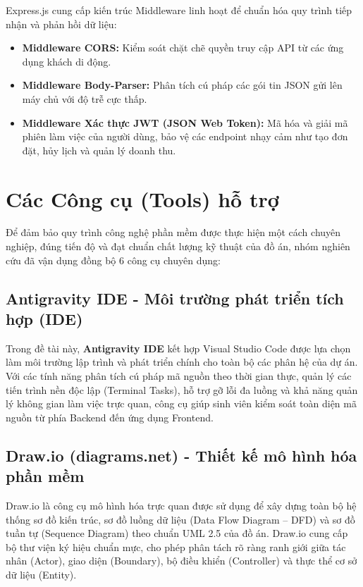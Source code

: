 Express.js cung cấp kiến trúc Middleware linh hoạt để chuẩn hóa quy trình tiếp nhận và phản hồi dữ liệu:
\begin{itemize}
    \item \textbf{Middleware CORS:} Kiểm soát chặt chẽ quyền truy cập API từ các ứng dụng khách di động.
    \item \textbf{Middleware Body-Parser:} Phân tích cú pháp các gói tin JSON gửi lên máy chủ với độ trễ cực thấp.
    \item \textbf{Middleware Xác thực JWT (JSON Web Token):} Mã hóa và giải mã phiên làm việc của người dùng, bảo vệ các endpoint nhạy cảm như tạo đơn đặt, hủy lịch và quản lý doanh thu.
\end{itemize}

\section{Các Công cụ (Tools) hỗ trợ}
\label{sec:cong-cu-ho-tro}

Để đảm bảo quy trình công nghệ phần mềm được thực hiện một cách chuyên nghiệp, đúng tiến độ và đạt chuẩn chất lượng kỹ thuật của đồ án, nhóm nghiên cứu đã vận dụng đồng bộ 6 công cụ chuyên dụng:

\subsection{Antigravity IDE - Môi trường phát triển tích hợp (IDE)}
Trong đề tài này, \textbf{Antigravity IDE} kết hợp Visual Studio Code được lựa chọn làm môi trường lập trình và phát triển chính cho toàn bộ các phân hệ của dự án. Với các tính năng phân tích cú pháp mã nguồn theo thời gian thực, quản lý các tiến trình nền độc lập (Terminal Tasks), hỗ trợ gỡ lỗi đa luồng và khả năng quản lý không gian làm việc trực quan, công cụ giúp sinh viên kiểm soát toàn diện mã nguồn từ phía Backend đến ứng dụng Frontend.

\subsection{Draw.io (diagrams.net) - Thiết kế mô hình hóa phần mềm}
Draw.io là công cụ mô hình hóa trực quan được sử dụng để xây dựng toàn bộ hệ thống sơ đồ kiến trúc, sơ đồ luồng dữ liệu (Data Flow Diagram -- DFD) và sơ đồ tuần tự (Sequence Diagram) theo chuẩn UML 2.5 của đồ án. Draw.io cung cấp bộ thư viện ký hiệu chuẩn mực, cho phép phân tách rõ ràng ranh giới giữa tác nhân (Actor), giao diện (Boundary), bộ điều khiển (Controller) và thực thể cơ sở dữ liệu (Entity).


